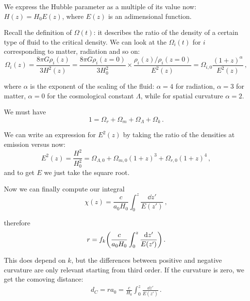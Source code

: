 \documentclass[main.tex]{subfiles}
\begin{document}
We express the Hubble parameter as a multiple of its value now: \(H(z) = H_0 E(z)\), where \(E(z)\) is an adimensional function.

Recall the definition of \(\Omega (t)\): it describes the ratio of the density of a certain type of fluid to the critical density. We can look at the \(\Omega_i (t)\) for \(i\) corresponding to matter, radiation and so on: 
%
\begin{equation}
  \Omega _i (z) = \frac{8 \pi G \rho _i (z)}{3 H^2(z)}
  = \frac{8 \pi G \rho_{i}(z=0)}{3 H_0 ^2} \times  \frac{\rho _i (z) / \rho_{i}(z=0)}{E^2(z)}
  = \Omega _{i,0} \frac{(1+z)^{\alpha }}{E^2(z)}
\,,
\end{equation}

where \(\alpha \) is the exponent of the scaling of the fluid: \(\alpha = 4\) for radiation, \(\alpha = 3\) for matter, \(\alpha = 0\) for the cosmological constant \(\Lambda \), while for spatial curvature \(\alpha = 2\).


We must have 
%
\begin{equation}
  1 = \Omega _r + \Omega _m + \Omega _\Lambda + \Omega _k
\,.
\end{equation}

We can write an expression for \(E^2(z)\) by taking the ratio of the densities at emission versus now:
%
\begin{equation}
  E^2(z) = \frac{H^2}{H_0^2} = 
  \Omega _{\Lambda , 0} +  \Omega_{m, 0} (1+z)^{3}
  +\Omega_{r, 0} (1+z)^4
\,,
\end{equation}
%
and to get \(E\) we just take the square root.

Now we can finally compute our integral 
%
\begin{equation}
  \chi (z) = \frac{c}{a_0 H_0 } \int_{0}^{z} \frac{\dd{z'} }{E(z')}
\,,
\end{equation}
%

therefore 
%
\begin{equation}
  r = f_k \qty(\frac{c}{a_0 H_0 } \int_0^z \frac{\dd{z'}   }{E(z')})
\,.
\end{equation}
%

This does depend on \(k\), but the differences between positive and negative curvature are only relevant starting from third order.
If the curvature is zero, we get the comoving distance:
%
\begin{align}
d_C = r a_0 = \frac{c}{H_0 } \int_{0}^{z} \frac{ \dd{z'}}{E(z')}
\,.
\end{align}
\end{document}
